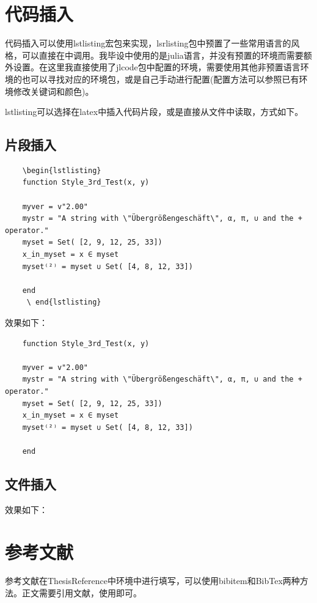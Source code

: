 \begin{spacing}{1.5}
	\section{代码插入}
	代码插入可以使用lstlisting宏包来实现，lsrlisting包中预置了一些常用语言的风格，可以直接在中调用。我毕设中使用的是julia语言，并没有预置的环境而需要额外设置。在这里我直接使用了jlcode包中配置的环境，需要使用其他非预置语言环境的也可以寻找对应的环境包，或是自己手动进行配置(配置方法可以参照已有环境修改关键词和颜色)。
		
	lstlisting可以选择在latex中插入代码片段，或是直接从文件中读取，方式如下。
	
	\subsection{片段插入}
	\begin{lstlisting}
	\begin{lstlisting}
	function Style_3rd_Test(x, y)
	
	myver = v"2.00"
	mystr = "A string with \"Übergrößengeschäft\", α, π, ∪ and the + operator."
	myset = Set( [2, 9, 12, 25, 33])
	x_in_myset = x ∈ myset
	myset⁽²⁾ = myset ∪ Set( [4, 8, 12, 33])
	
	end
	 \ end{lstlisting}
	\end{lstlisting}
	效果如下：
	\begin{lstlisting}
	function Style_3rd_Test(x, y)
	
	myver = v"2.00"
	mystr = "A string with \"Übergrößengeschäft\", α, π, ∪ and the + operator."
	myset = Set( [2, 9, 12, 25, 33])
	x_in_myset = x ∈ myset
	myset⁽²⁾ = myset ∪ Set( [4, 8, 12, 33])
	
	end
	\end{lstlisting}
	
	\subsection{文件插入}
	
	
	效果如下：
	
	\section{参考文献}
	参考文献在ThesisReference中环境中进行填写，可以使用bibitem和BibTex两种方法。正文需要引用文献，使用即可。
	

\end{spacing}
